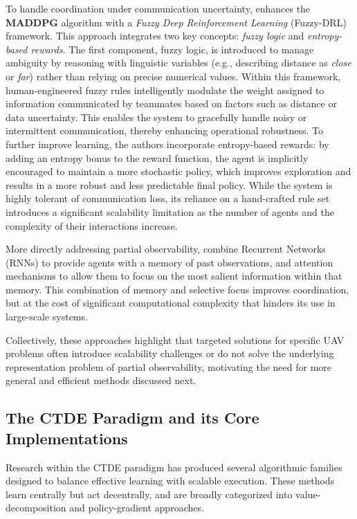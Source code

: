 To handle coordination under communication uncertainty, \parencite{fuzzy_maddpg} enhances the \textbf{MADDPG} algorithm with a \textit{Fuzzy Deep Reinforcement Learning} (Fuzzy-DRL) framework. This approach integrates two key concepts: \textit{fuzzy logic} and \textit{entropy-based rewards}. The first component, fuzzy logic, is introduced to manage ambiguity by reasoning with linguistic variables (e.g., describing distance as \textit{close} or \textit{far}) rather than relying on precise numerical values. Within this framework, human-engineered fuzzy rules intelligently modulate the weight assigned to information communicated by teammates based on factors such as distance or data uncertainty. This enables the system to gracefully handle noisy or intermittent communication, thereby enhancing operational robustness. To further improve learning, the authors incorporate entropy-based rewards: by adding an entropy bonus to the reward function, the agent is implicitly encouraged to maintain a more stochastic policy, which improves exploration and results in a more robust and less predictable final policy. While the system is highly tolerant of communication loss, its reliance on a hand-crafted rule set introduces a significant scalability limitation as the number of agents and the complexity of their interactions increase.

More directly addressing partial observability,
\parencite{collaborative_decision-making} combine Recurrent Networks (RNNs) to provide agents with a memory of past observations, and attention mechanisms to allow them to focus on the most salient information within that memory. This combination of memory and selective focus improves coordination, but at the cost of significant computational complexity that hinders its use in large-scale systems.

Collectively, these approaches highlight that targeted solutions for specific UAV problems often introduce scalability challenges or do not solve the underlying representation problem of partial observability, motivating the need for more general and efficient methods discussed next.
\subsection{The CTDE Paradigm and its Core Implementations}
\label{subsec:ctde}
Research within the CTDE paradigm has produced several algorithmic families designed to balance effective learning with scalable execution. These methods learn centrally but act decentrally, and are broadly categorized into value-decomposition and policy-gradient approaches.

